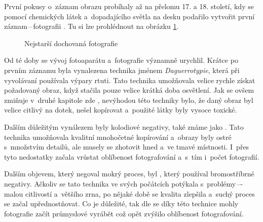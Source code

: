 První pokusy o~záznam obrazu probíhaly až na přelomu 17. a 18. století, kdy se pomocí chemických látek a~dopadajícího světla na desku podařilo vytvořit první záznam\,--\,fotografii \cite{obrazky_historie}. Tu si lze prohlédnout na obrázku \ref{prvni_foto}.

\begin{figure}[h]
\begin{center}
\caption{Nejstarší dochovaná fotografie \cite{obrazek_prvni}}
\label{prvni_foto}
\end{center}
\end{figure}

Od té doby se vývoj fotoaparátu a~fotografie významně urychlil. Krátce po prvním záznamu byla vynalezena technika jménem \textit{Daguerrotypie}, která při vyvolávaní používala výpary rtuti. Tato technika umožňovala velice rychle získat požadovaný obraz, když stačila pouze velice krátká doba osvětlení. Jak se ovšem zmiňuje v~druhé kapitole zde \cite{obrazky_historie}, nevýhodou této techniky bylo, že daný obraz byl velice citlivý na dotek, nešel kopírovat a~použité látky byly vysoce toxické.

Dalším důležitým vynálezem byly kolodiové negativy, také známe jako . Tato technika umožňovala kvalitní mnohočetné kopírování a~obrazy byly ostré s~množstvím detailů, ale musely se zhotovit hned a~ve tmavé místnosti. I~přes tyto nedostatky začala vrůstat oblíbenost fotografování a~s~tím i~počet fotografií.

Dalším objevem, který negoval mokrý proces, byl , který používal bromostříbrné negativy. Ačkoliv se tato technika ve svých počátcích potýkala s~problémy\,–-\,malou citlivostí a~většího zrna, po nějaké době se kvalita zlepšila a~suchý proces se začal upřednostňovat. Co je důležité, tak dle \cite{obrazky_historie} se díky této technice mohly fotografie začít průmyslové vyrábět což opět zvýšilo oblíbenost fotografování.

